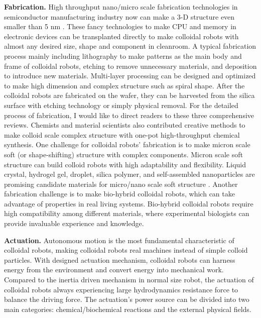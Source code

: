 \textbf{Fabrication.}  High throughput nano/micro scale fabrication technologies in semiconductor manufacturing industry now can make a 3-D structure even smaller than 5 nm \autocite{mokhlesi2010three}. These fancy technologies to make CPU and memory in electronic devices can be transplanted directly to make colloidal robots with almost any desired size, shape and component in cleanroom\autocite{koman2018colloidal}. A typical fabrication process mainly including lithography to make patterns as the main body and frame of colloidal robots, etching to remove unnecessary materials, and deposition to introduce new materials. Multi-layer processing can be designed and optimized to make high dimension and complex structure such as spiral shape\autocite{zhang2009artificial}. After the colloidal robots are fabricated on the wafer, they can be harvested from the silica surface with etching technology or simply physical removal. For the detailed process of fabrication, I would like to direct readers to these three comprehensive reviews\autocite{wong2016synthetic,wang2017emerging, zha2018tubular}. Chemists and material scientists also contributed creative methods to make colloid scale complex structure with one-pot high-throughput chemical synthesis\autocite{youssef2016shape,gong2017patchy,wang2019active}. One challenge for colloidal robots' fabrication is to   make  micron scale soft (or shape-shifting) structure with complex components. Micron scale soft structure  can build colloid robots with high adaptability and flexibility. Liquid crystal, hydrogel gel, droplet, silica polymer, and self-assembled nanoparticles are promising candidate materials for micro/nano scale soft structure \autocite{leong2009tetherless,denkov2015self,zhang2017printing,wei2019molecular}. Another fabrication challenge is to make bio-hybrid colloidal robots,  which can take advantage of  properties in real living systems. Bio-hybrid colloidal robots require high compatibility  among different materials, where experimental biologists can provide invaluable experience and knowledge\autocite{stanton2016biohybrid,magdanz2013development}.

\textbf{Actuation.} Autonomous motion is the most fundamental characteristic of colloidal robots, making colloidal robots real machines instead of simple colloid particles. With designed actuation mechanism, colloidal robots can harness energy from the environment and convert energy into mechanical work. Compared to the inertia driven mechanism in normal size robot, the actuation of colloidal robots always experiencing large hydrodynamics resistance force to balance the driving force. The actuation's power source can be divided into two main categories: chemical/biochemical reactions and the external physical fields. 

